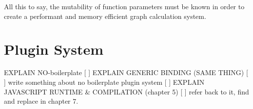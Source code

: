 All this to say, the mutability of function parameters must be known in order to create a performant and memory efficient graph calculation system.  






\newpage


\section{Plugin System} 
\label{sec:method:plugin-system}

\begin{note}
  [ ] EXPLAIN NO-boilerplate
  [ ] EXPLAIN GENERIC BINDING (SAME THING)
  [ ] write something about no boilerplate plugin system
  [ ] EXPLAIN JAVASCRIPT RUNTIME & COMPILATION (chapter 5)
  [ ] refer back to it, find and replace in chapter 7.
\end{note}
  


